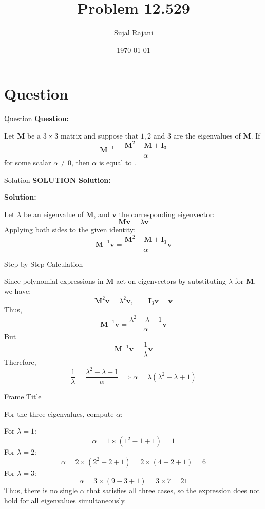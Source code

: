 \documentclass{beamer}
\title{Problem 12.529}
\author{Sujal Rajani}
\date{\today}
\theoremstyle{remark}
\numberwithin{equation}{section}
\begin{document}
\begin{frame}
\titlepage
\end{frame}

\section{Question}
\begin{frame}{Question}
\textbf{Question:}

Let $\mathbf{M}$ be a $3 \times 3$ matrix and suppose that $1, 2$ and $3$ are the eigenvalues of $\mathbf{M}$. If
\[
\mathbf{M}^{-1} = \frac{\mathbf{M}^2 - \mathbf{M} + \mathbf{I}_3}{\alpha}
\]
for some scalar $\alpha \neq 0$, then $\alpha$ is equal to \underline{\qquad}.

\end{frame}
\begin{frame}{Solution}
\textbf{SOLUTION}
\textbf{Solution:}

\textbf{Solution:}

Let $\lambda$ be an eigenvalue of $\mathbf{M}$, and $\mathbf{v}$ the corresponding eigenvector: 
\[
\mathbf{M} \mathbf{v} = \lambda \mathbf{v}
\]
Applying both sides to the given identity:
\[
\mathbf{M}^{-1} \mathbf{v} = \frac{\mathbf{M}^2 - \mathbf{M} + \mathbf{I}_3}{\alpha} \mathbf{v}
\]
     \end{frame}
    
     \begin{frame}{ Step-by-Step Calculation}    

Since polynomial expressions in $\mathbf{M}$ act on eigenvectors by substituting $\lambda$ for $\mathbf{M}$, we have:
\[
\mathbf{M}^2 \mathbf{v} = \lambda^2 \mathbf{v}, \qquad \mathbf{I}_3 \mathbf{v} = \mathbf{v}
\]
Thus,
\[
\mathbf{M}^{-1} \mathbf{v} = \frac{\lambda^2 - \lambda + 1}{\alpha} \mathbf{v}
\]
But 
\[
\mathbf{M}^{-1} \mathbf{v} = \frac{1}{\lambda} \mathbf{v}
\]
Therefore,
\[
\frac{1}{\lambda} = \frac{\lambda^2 - \lambda + 1}{\alpha}
\implies
\alpha = \lambda (\lambda^2 - \lambda + 1)
\]
\end{frame}
\begin{frame}{Frame Title}

For the three eigenvalues, compute $\alpha$:

For $\lambda = 1$:
\[
\alpha = 1 \times (1^2 - 1 + 1) = 1
\]
For $\lambda = 2$:
\[
\alpha = 2 \times (2^2 - 2 + 1) = 2 \times (4 - 2 + 1) = 6
\]
For $\lambda = 3$:
\[
\alpha = 3 \times (9 - 3 + 1) = 3 \times 7 = 21
\]
Thus, there is no single $\alpha$ that satisfies all three cases, so the expression does not hold for all eigenvalues simultaneously.

\end{frame}

     
\end{document}
